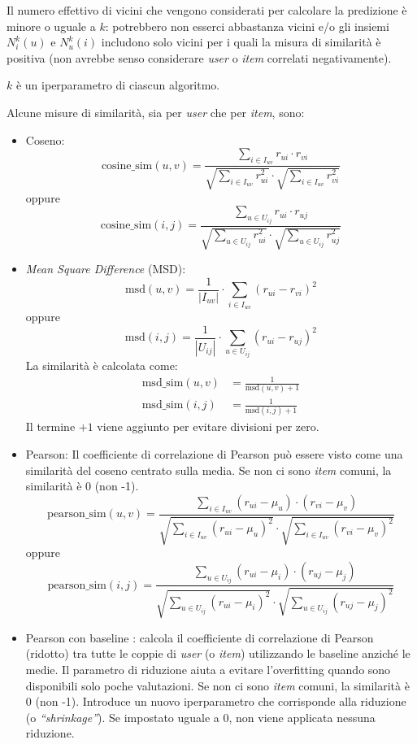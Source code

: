 Il numero effettivo di vicini che vengono considerati per calcolare la predizione è minore o uguale a \(k\): potrebbero non esserci abbastanza vicini e/o gli insiemi \(N_i^k(u)\) e \(N_u^k(i)\) includono solo vicini per i quali la misura di similarità è positiva (non avrebbe senso considerare \emph{user} o \emph{item} correlati negativamente).

\(k\) è un iperparametro di ciascun algoritmo.

Alcune misure di similarità, sia per \emph{user} che per \emph{item}, sono:
\begin{itemize}
    \item Coseno:
        \[
        \text{cosine\_sim}(u, v) = \frac{\sum_{i \in I_{uv}} r_{ui} \cdot r_{vi}}{\sqrt{\sum_{i \in I_{uv}} r_{ui}^2} \cdot \sqrt{\sum_{i \in I_{uv}} r_{vi}^2}}
        \]
        oppure
        \[
        \text{cosine\_sim}(i, j) = \frac{\sum_{u \in U_{ij}} r_{ui} \cdot r_{uj}}{\sqrt{\sum_{u \in U_{ij}} r_{ui}^2} \cdot \sqrt{\sum_{u \in U_{ij}} r_{uj}^2}}
        \]
    \item \emph{Mean Square Difference} (MSD):
        \[
        \text{msd}(u, v) = \frac{1}{|I_{uv}|} \cdot \sum_{i \in I_{uv}} (r_{ui} - r_{vi})^2
        \]
        oppure
        \[
        \text{msd}(i, j) = \frac{1}{|U_{ij}|} \cdot \sum_{u \in U_{ij}} (r_{ui} - r_{uj})^2
        \]
        La similarità è calcolata come:
        \begin{align*}
            \text{msd\_sim}(u, v) &= \frac{1}{\text{msd}(u, v) + 1} \\
            \text{msd\_sim}(i, j) &= \frac{1}{\text{msd}(i, j) + 1}
        \end{align*}
        Il termine \(+1\) viene aggiunto per evitare divisioni per zero.
    \item Pearson: Il coefficiente di correlazione di Pearson può essere visto come una similarità del coseno centrato sulla media. Se non ci sono \emph{item} comuni, la similarità è 0 (non -1).
        \[
        \text{pearson\_sim}(u, v) = \frac{\sum_{i \in I_{uv}} (r_{ui} - \mu_u) \cdot (r_{vi} - \mu_v)}{\sqrt{\sum_{i \in I_{uv}} (r_{ui} - \mu_u)^2} \cdot \sqrt{\sum_{i \in I_{uv}} (r_{vi} - \mu_v)^2}}
        \]
        oppure
        \[
        \text{pearson\_sim}(i, j) = \frac{\sum_{u \in U_{ij}} (r_{ui} - \mu_i) \cdot (r_{uj} - \mu_j)}{\sqrt{\sum_{u \in U_{ij}} (r_{ui} - \mu_i)^2} \cdot \sqrt{\sum_{u \in U_{ij}} (r_{uj} - \mu_j)^2}}
        \]
    \item Pearson con baseline \cite{Recommendation_book}: calcola il coefficiente di correlazione di Pearson (ridotto) tra tutte le coppie di \emph{user} (o \emph{item}) utilizzando le baseline anziché le medie. Il parametro di riduzione aiuta a evitare l'overfitting quando sono disponibili solo poche valutazioni. Se non ci sono \emph{item} comuni, la similarità è 0 (non -1). Introduce un nuovo iperparametro che corrisponde alla riduzione (o \emph{``shrinkage''}). Se impostato uguale a 0, non viene applicata nessuna riduzione.

\end{itemize}

